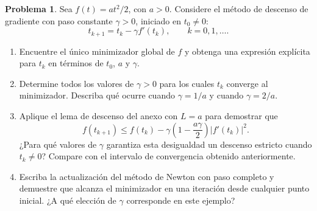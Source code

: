 \documentclass[a4paper,12 pt]{article}
\theoremstyle{definition}
\newtheorem{problema}{Problema}
\begin{document}
\begin{problema}
Sea $f(t)=at^2/2$, con $a>0$. Considere el método de descenso de gradiente con paso constante $\gamma>0$, iniciado en $t_0\neq0$:
\[
t_{k+1}=t_k-\gamma f'(t_k),\qquad k=0,1,\ldots.
\]

\begin{enumerate}
	\item Encuentre el único minimizador global de $f$ y obtenga una expresión explícita para $t_k$ en términos de $t_0$, $a$ y $\gamma$.
	\item Determine todos los valores de $\gamma>0$ para los cuales $t_k$ converge al minimizador. Describa qué ocurre cuando $\gamma=1/a$ y cuando $\gamma=2/a$.
	\item Aplique el lema de descenso del anexo con $L=a$ para demostrar que
	\[
	f(t_{k+1})\leq f(t_k)-\gamma\left(1-\frac{a\gamma}{2}\right)|f'(t_k)|^2.
	\]
	¿Para qué valores de $\gamma$ garantiza esta desigualdad un descenso estricto cuando $t_k\neq0$? Compare con el intervalo de convergencia obtenido anteriormente.
	\item Escriba la actualización del método de Newton con paso completo y demuestre que alcanza el minimizador en una iteración desde cualquier punto inicial. ¿A qué elección de $\gamma$ corresponde en este ejemplo?
\end{enumerate}
\end{problema}
\end{document}
